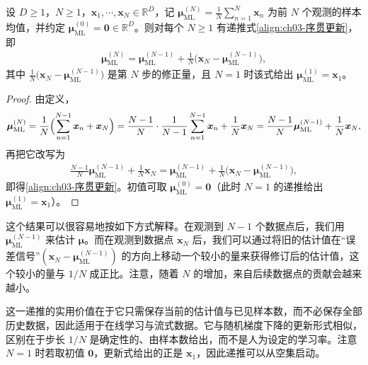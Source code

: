 \documentclass[../../main.tex]{subfiles}
\begin{document}
\begin{proposition}[样本均值的序贯更新]\label{proposition:ch03-序贯更新}
设 $D\geqslant1$，$N\geqslant1$，$\boldsymbol{x}_1,\cdots,\boldsymbol{x}_N\in\mathbb{R}^{D}$，记 $\boldsymbol{\mu}_{\mathrm{ML}}^{(N)}=\frac{1}{N}\sum_{n=1}^{N}\boldsymbol{x}_n$ 为前 $N$ 个观测的样本均值，并约定 $\boldsymbol{\mu}_{\mathrm{ML}}^{(0)}=\boldsymbol{0}\in\mathbb{R}^{D}$。则对每个 $N\geqslant1$ 有递推式\eqref{align:ch03-序贯更新}，即
\begin{align*}
\boldsymbol{\mu}_{\mathrm{ML}}^{(N)}=\boldsymbol{\mu}_{\mathrm{ML}}^{(N-1)}+\frac{1}{N}\bigl(\boldsymbol{x}_N-\boldsymbol{\mu}_{\mathrm{ML}}^{(N-1)}\bigr),
\end{align*}
其中 $\frac{1}{N}\bigl(\boldsymbol{x}_N-\boldsymbol{\mu}_{\mathrm{ML}}^{(N-1)}\bigr)$ 是第 $N$ 步的修正量，且 $N=1$ 时该式给出 $\boldsymbol{\mu}_{\mathrm{ML}}^{(1)}=\boldsymbol{x}_1$。
\end{proposition}
\begin{proof}
由定义，
\begin{align*}
\boldsymbol{\mu}_{\mathrm{ML}}^{(N)}=\frac{1}{N}\Bigl(\sum_{n=1}^{N-1}\boldsymbol{x}_n+\boldsymbol{x}_N\Bigr)=\frac{N-1}{N}\cdot\frac{1}{N-1}\sum_{n=1}^{N-1}\boldsymbol{x}_n+\frac{1}{N}\boldsymbol{x}_N=\frac{N-1}{N}\boldsymbol{\mu}_{\mathrm{ML}}^{(N-1)}+\frac{1}{N}\boldsymbol{x}_N,
\end{align*}
再把它改写为
\begin{align*}
\frac{N-1}{N}\boldsymbol{\mu}_{\mathrm{ML}}^{(N-1)}+\frac{1}{N}\boldsymbol{x}_N=\boldsymbol{\mu}_{\mathrm{ML}}^{(N-1)}+\frac{1}{N}\bigl(\boldsymbol{x}_N-\boldsymbol{\mu}_{\mathrm{ML}}^{(N-1)}\bigr),
\end{align*}
即得\eqref{align:ch03-序贯更新}。初值可取 $\boldsymbol{\mu}_{\mathrm{ML}}^{(0)}=\boldsymbol{0}$（此时 $N=1$ 的递推给出 $\boldsymbol{\mu}_{\mathrm{ML}}^{(1)}=\boldsymbol{x}_1$）。
\end{proof}

\begin{remark}
这个结果可以很容易地按如下方式解释。在观测到 $N-1$ 个数据点后，我们用 $\boldsymbol{\mu}_{\mathrm{ML}}^{(N-1)}$ 来估计 $\boldsymbol{\mu}$。而在观测到数据点 $\boldsymbol{x}_N$ 后，我们可以通过将旧的估计值在“误差信号”$(\boldsymbol{x}_N-\boldsymbol{\mu}_{\mathrm{ML}}^{(N-1)})$ 的方向上移动一个较小的量来获得修订后的估计值，这个较小的量与 $1/N$ 成正比。注意，随着 $N$ 的增加，来自后续数据点的贡献会越来越小。

这一递推的实用价值在于它只需保存当前的估计值与已见样本数，而不必保存全部历史数据，因此适用于在线学习与流式数据。它与随机梯度下降的更新形式相似，区别在于步长 $1/N$ 是确定性的、由样本数给出，而不是人为设定的学习率。注意 $N=1$ 时若取初值 $\boldsymbol{0}$，更新式给出的正是 $\boldsymbol{x}_1$，因此递推可以从空集启动。
\end{remark}
\end{document}
